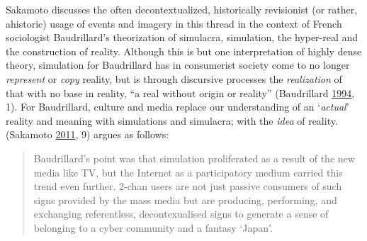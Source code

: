\documentclass[10pt,british,A4paper,,openany]{memoir}
\begin{document}
Sakamoto discusses the often decontextualized, historically revisionist
(or rather, ahistoric) usage of events and imagery in this thread in the
context of French sociologist Baudrillard's theorization of simulacra,
simulation, the hyper-real and the construction of reality. Although
this is but one interpretation of highly dense theory, simulation for
Baudrillard has in consumerist society come to no longer
\emph{represent} or \emph{copy} reality, but is through discursive
processes the \emph{realization} of that with no base in reality, ``a
real without origin or reality'' (Baudrillard
\protect\hyperlink{ref-baudrillard_simulacra_1994}{1994}, 1). For
Baudrillard, culture and media replace our understanding of an
`\emph{actual}' reality and meaning with simulations and simulacra; with
the \emph{idea} of reality. (Sakamoto
\protect\hyperlink{ref-sakamoto_koreans_2011}{2011}, 9) argues as
follows:

\begin{quote}
Baudrillard's point was that simulation proliferated as a result of the
new media like TV, but the Internet as a participatory medium carried
this trend even further. 2-chan users are not just passive consumers of
such signs provided by the mass media but are producing, performing, and
exchanging referentless, decontexualised signs to generate a sense of
belonging to a cyber community and a fantasy `Japan'.
\end{quote}
\end{document}
